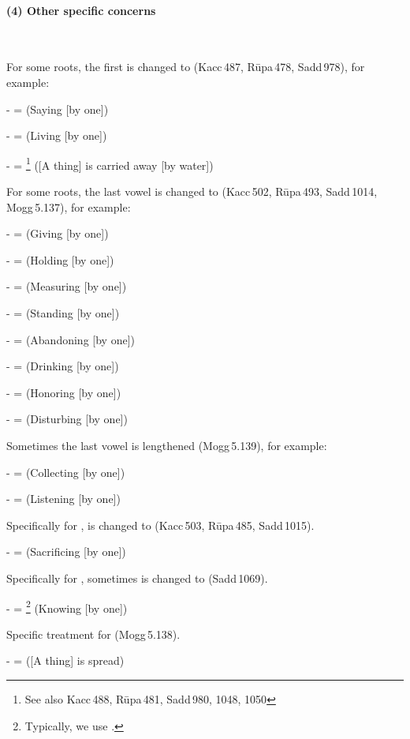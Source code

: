\paragraph*{(4) Other specific concerns} \ \par
For some roots, the first  is changed to  (Kacc\,487, R\=upa\,478, Sadd\,978), for example:\par
-  =  (Saying [by one])\par
-  =  (Living [by one])\par
-  = \footnote{See also Kacc\,488, R\=upa\,481, Sadd\,980, 1048, 1050} ([A thing] is carried away [by water])\par
For some roots, the last vowel is changed to  (Kacc\,502, R\=upa\,493, Sadd\,1014, Mogg\,5.137), for example:\par
-  =  (Giving [by one])\par
-  =  (Holding [by one])\par
-  =  (Measuring [by one])\par
-  =  (Standing [by one])\par
-  =  (Abandoning [by one])\par
-  =  (Drinking [by one])\par
-  =  (Honoring [by one])\par
-  =  (Disturbing [by one])\par
Sometimes the last vowel is lengthened (Mogg\,5.139), for example:\par
-  =  (Collecting [by one])\par
-  =  (Listening [by one])\par
Specifically for ,  is changed to  (Kacc\,503, R\=upa\,485, Sadd\,1015).\par
-  =  (Sacrificing [by one])\par
Specifically for , sometimes  is changed to  (Sadd\,1069).\par
-  = \footnote{Typically, we use .} (Knowing [by one])\par
Specific treatment for  (Mogg\,5.138).\par
-  =  ([A thing] is spread)\par

